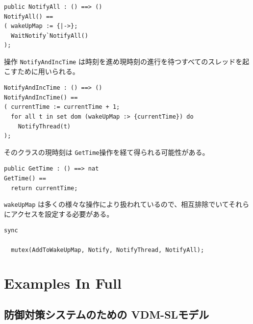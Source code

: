 \documentclass[\pformat,12pt]{jreport}
\begin{document}
\begin{lstlisting}
public NotifyAll : () ==> ()
NotifyAll() ==
( wakeUpMap := {|->};
  WaitNotify`NotifyAll()
);
\end{lstlisting}

操作 \texttt{NotifyAndIncTime} は時刻を進め現時刻の進行を待つすべてのスレッドを起こすために用いられる。

\begin{lstlisting}
NotifyAndIncTime : () ==> ()
NotifyAndIncTime() ==
( currentTime := currentTime + 1;
  for all t in set dom (wakeUpMap :> {currentTime}) do
    NotifyThread(t)
);
\end{lstlisting}

そのクラスの現時刻は \texttt{GetTime}操作を経て得られる可能性がある。

\begin{lstlisting}
public GetTime : () ==> nat
GetTime() ==
  return currentTime;
\end{lstlisting}

\texttt{wakeUpMap} は多くの様々な操作により扱われているので、相互排除でいてそれらにアクセスを設定する必要がある。

\begin{lstlisting}
sync

  mutex(AddToWakeUpMap, Notify, NotifyThread, NotifyAll);
\end{lstlisting}

\chapter{Examples In Full}\label{app:listing}

\section{防御対策システムのための VDM-SLモデル}\label{app:VDMSLmodel}
\end{document}
